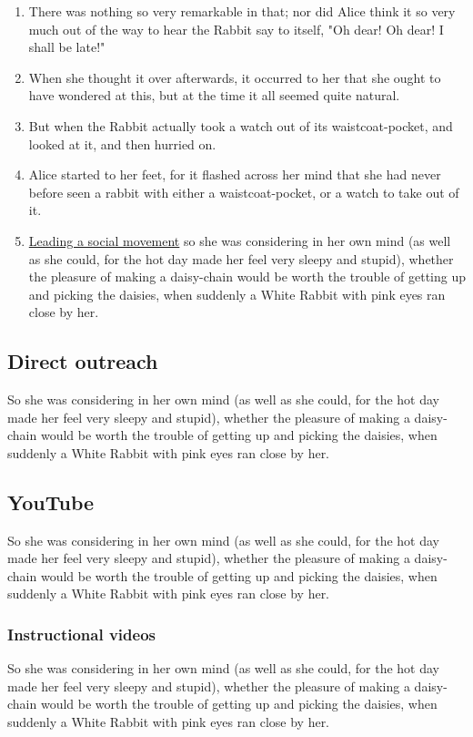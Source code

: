 \documentclass[12pt]{article}
\begin{document}
\begin{enumerate}
\item There was nothing so very remarkable in that; nor did Alice think it so very much out of the way to hear the Rabbit say to itself, "Oh dear! Oh dear! I shall be late!"
\item When she thought it over afterwards, it occurred to her that she ought to have wondered at this, but at the time it all seemed quite natural.
\item But when the Rabbit actually took a watch out of its waistcoat-pocket, and looked at it, and then hurried on.
\item Alice started to her feet, for it flashed across her mind that she had never before seen a rabbit with either a waistcoat-pocket, or a watch to take out of it.
\item \href{http://jaydixit.com}{Leading a social movement} so she was considering in her own mind (as well as she could, for the hot day made her feel very sleepy and stupid), whether the pleasure of making a daisy-chain would be worth the trouble of getting up and picking the daisies, when suddenly a White Rabbit with pink eyes ran close by her.
\end{enumerate}

\subsection{Direct outreach}
\label{sec:orgheadline29}
So she was considering in her own mind (as well as she could, for the hot day made her feel very sleepy and stupid), whether the pleasure of making a daisy-chain would be worth the trouble of getting up and picking the daisies, when suddenly a White Rabbit with pink eyes ran close by her. 

\subsection{YouTube}
\label{sec:orgheadline34}
So she was considering in her own mind (as well as she could, for the hot day made her feel very sleepy and stupid), whether the pleasure of making a daisy-chain would be worth the trouble of getting up and picking the daisies, when suddenly a White Rabbit with pink eyes ran close by her. 

\subsubsection{Instructional videos}
\label{sec:orgheadline30}
So she was considering in her own mind (as well as she could, for the hot day made her feel very sleepy and stupid), whether the pleasure of making a daisy-chain would be worth the trouble of getting up and picking the daisies, when suddenly a White Rabbit with pink eyes ran close by her. 
\end{document}

